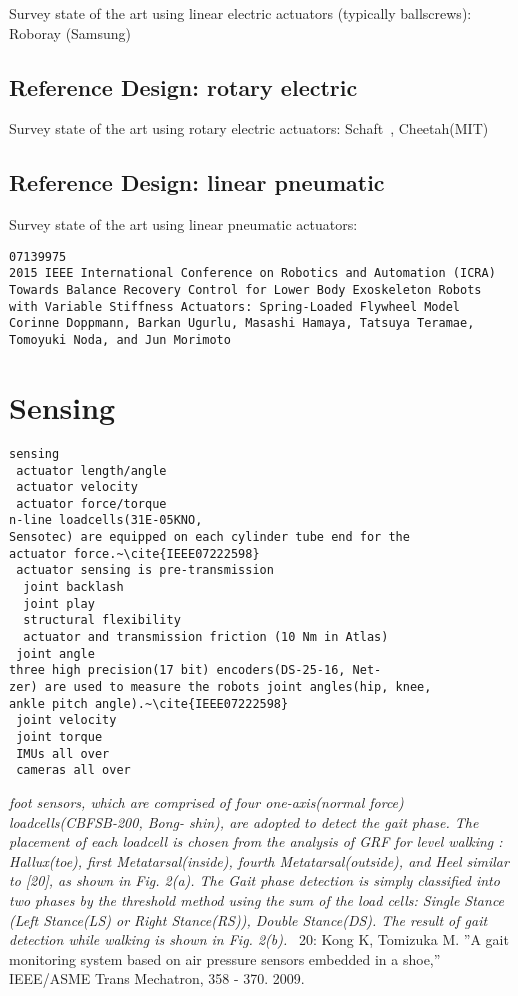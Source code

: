 \documentclass[letterpaper,12pt,fullpage]{article}
\begin{document}
Survey state of the art using linear electric actuators (typically ballscrews):
Roboray (Samsung)

\subsection{Reference Design: rotary electric}

Survey state of the art using rotary electric actuators:
Schaft~\cite{shaft_foot_placement,shaft_push_recov}, Cheetah(MIT)

\subsection{Reference Design: linear pneumatic}

Survey state of the art using linear pneumatic actuators:

\begin{verbatim}
07139975
2015 IEEE International Conference on Robotics and Automation (ICRA)
Towards Balance Recovery Control for Lower Body Exoskeleton Robots
with Variable Stiffness Actuators: Spring-Loaded Flywheel Model
Corinne Doppmann, Barkan Ugurlu, Masashi Hamaya, Tatsuya Teramae,
Tomoyuki Noda, and Jun Morimoto
\end{verbatim}

\section{Sensing}

\begin{verbatim}
sensing
 actuator length/angle
 actuator velocity
 actuator force/torque 
n-line loadcells(31E-05KNO,
Sensotec) are equipped on each cylinder tube end for the
actuator force.~\cite{IEEE07222598}
 actuator sensing is pre-transmission
  joint backlash
  joint play
  structural flexibility
  actuator and transmission friction (10 Nm in Atlas)
 joint angle
three high precision(17 bit) encoders(DS-25-16, Net-
zer) are used to measure the robots joint angles(hip, knee,
ankle pitch angle).~\cite{IEEE07222598}
 joint velocity
 joint torque
 IMUs all over
 cameras all over
\end{verbatim}

{\it foot sensors, which are comprised
of four one-axis(normal force) loadcells(CBFSB-200, Bong-
shin), are adopted to detect the gait phase. The placement
of each loadcell is chosen from the analysis of GRF for
level walking : Hallux(toe), first Metatarsal(inside), fourth
Metatarsal(outside), and Heel similar to [20], as shown in
Fig. 2(a). The Gait phase detection is simply classified
into two phases by the threshold method using the sum
of the load cells: Single Stance (Left Stance(LS) or Right
Stance(RS)), Double Stance(DS). The result of gait detection
while walking is shown in Fig. 2(b).}~\cite{IEEE07222598}
20: Kong K, Tomizuka M. ”A gait monitoring system based on air pressure
sensors embedded in a shoe,” IEEE/ASME Trans Mechatron, 358 - 370.
2009.
\end{document}
